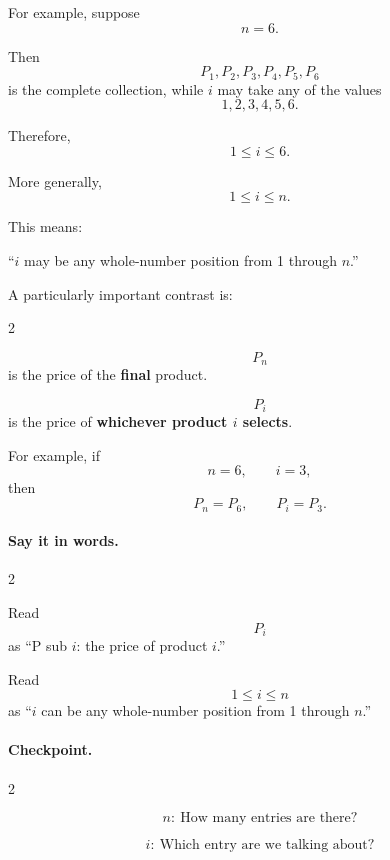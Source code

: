 	For example, suppose
	\[
	n=6.
	\]
	
	Then
	\[
	P_1,P_2,P_3,P_4,P_5,P_6
	\]
	is the complete collection, while $i$ may take any of the values
	\[
	1,2,3,4,5,6.
	\]
	
	Therefore,
	\[
	1\leq i\leq6.
	\]
	
	More generally,
	\[
	1\leq i\leq n.
	\]
	
	This means:
	
	\begin{center}
		``$i$ may be any whole-number position from 1 through $n$.''
	\end{center}
	
	A particularly important contrast is:
	
	{
		\setlength{\columnseprule}{0.4pt}
		\setlength{\columnsep}{1.5em}
		\begin{multicols}{2}
			
			\[
			P_n
			\]
			is the price of the \textbf{final} product.
			
			\columnbreak
			
			\[
			P_i
			\]
			is the price of \textbf{whichever product $i$ selects}.
			
		\end{multicols}
	}
	
	For example, if
	\[
	n=6,\qquad i=3,
	\]
	then
	\[
	P_n=P_6,
	\qquad
	P_i=P_3.
	\]
	
	\paragraph{Say it in words.}
	
	{
		\setlength{\columnseprule}{0.4pt}
		\setlength{\columnsep}{1.5em}
		\begin{multicols}{2}
			
			Read
			\[
			P_i
			\]
			as ``P sub $i$: the price of product $i$.''
			
			\columnbreak
			
			Read
			\[
			1\leq i\leq n
			\]
			as ``$i$ can be any whole-number position from 1 through $n$.''
			
		\end{multicols}
	}
	
	\paragraph{Checkpoint.}
	
	{
		\setlength{\columnseprule}{0.4pt}
		\setlength{\columnsep}{1.5em}
		\begin{multicols}{2}
			
			\[
			\boxed{n:\ \text{How many entries are there?}}
			\]
			
			\columnbreak
			
			\[
			\boxed{i:\ \text{Which entry are we talking about?}}
			\]
			
		\end{multicols}
	}
	
